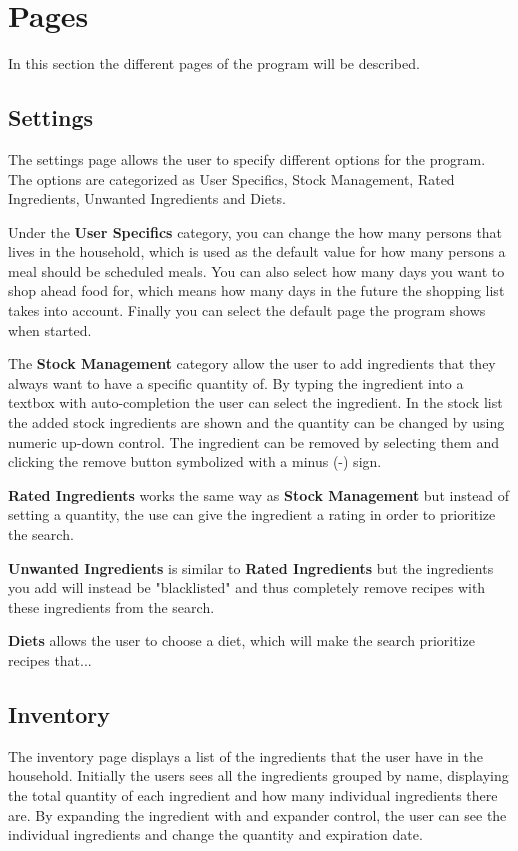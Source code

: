 \chapter{Pages}
In this section the different pages of the program will be described. 

\section{Settings} \label{ss:settings}
The settings page allows the user to specify different options for the program. The options are categorized as User Specifics, Stock Management, Rated Ingredients, Unwanted Ingredients and Diets.

Under the \textbf{User Specifics} category, you can change the how many persons that lives in the household, which is used as the default value for how many persons a meal should be scheduled meals. You can also select how many days you want to shop ahead food for, which means how many days in the future the shopping list takes into account. Finally you can select the default page the program shows when started.

The \textbf{Stock Management} category allow the user to add ingredients that they always want to have a specific quantity of. By typing the ingredient into a textbox with auto-completion the user can select the ingredient. In the stock list the added stock ingredients are shown and the quantity can be changed by using numeric up-down control. The ingredient can be removed by selecting them and clicking the remove button symbolized with a minus (-) sign.

\textbf{Rated Ingredients} works the same way as \textbf{Stock Management} but instead of setting a quantity, the use can give the ingredient a rating in order to prioritize the search. 

\textbf{Unwanted Ingredients} is similar to \textbf{Rated Ingredients} but the ingredients you add will instead be "blacklisted" and thus completely remove recipes with these ingredients from the search.

\textbf{Diets} allows the user to choose a diet, which will make the search prioritize recipes that... 

\section{Inventory} \label{ss:inventory}
The inventory page displays a list of the ingredients that the user have in the household. Initially the users sees all the ingredients grouped by name, displaying the total quantity of each ingredient and how many individual ingredients there are. By expanding the ingredient with and expander control, the user can see the individual ingredients and change the quantity and expiration date.

